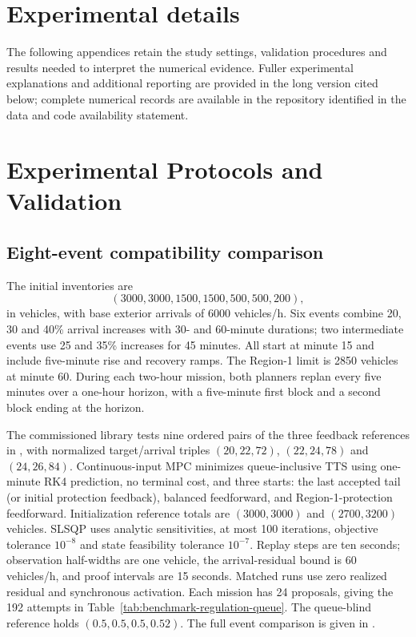 \section*{Experimental details}
The following appendices retain the study settings, validation procedures
and results needed to interpret the numerical evidence. Fuller
experimental explanations and additional reporting are provided in the
long version cited below; complete numerical records are available in the
repository identified in the data and code availability statement.

\section{Experimental Protocols and Validation}
\label{app:reusable-benchmark}

\subsection{Eight-event compatibility comparison}
\label{app:compatibility-protocol}
The initial inventories are
\[
(3000,3000,1500,1500,500,500,200),
\]
in vehicles, with base exterior arrivals of 6000 vehicles/h. Six events
combine 20, 30 and 40\% arrival increases with 30- and 60-minute durations;
two intermediate events use 25 and 35\% increases for 45 minutes. All start
at minute 15 and include five-minute rise and recovery ramps. The Region-1
limit is 2850 vehicles at minute 60. During each two-hour mission, both
planners replan every five minutes over a one-hour horizon, with a
five-minute first block and a second block ending at the horizon.

The commissioned library tests nine ordered pairs of the three feedback
references in , with normalized target/arrival triples
$(20,22,72)$, $(22,24,78)$ and $(24,26,84)$. Continuous-input MPC minimizes
queue-inclusive TTS using one-minute RK4 prediction, no terminal cost, and
three starts: the last accepted tail (or initial protection feedback),
balanced feedforward, and Region-1-protection feedforward. Initialization
reference totals are $(3000,3000)$ and $(2700,3200)$ vehicles. SLSQP uses
analytic sensitivities, at most 100 iterations, objective tolerance
$10^{-8}$ and state feasibility tolerance $10^{-7}$. Replay steps are ten
seconds; observation half-widths are one vehicle, the arrival-residual
bound is 60 vehicles/h, and proof intervals are 15 seconds. Matched runs
use zero realized residual and synchronous activation. Each mission has
24 proposals, giving the 192 attempts in
Table~\ref{tab:benchmark-regulation-queue}. The queue-blind reference holds
$(0.5,0.5,0.5,0.52)$. The full event comparison is given in .


